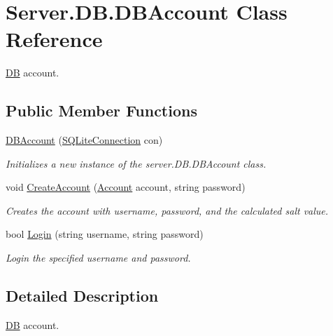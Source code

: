 \hypertarget{classServer_1_1DB_1_1DBAccount}{\section{Server.\-D\-B.\-D\-B\-Account Class Reference}
\label{classServer_1_1DB_1_1DBAccount}
}


\hyperlink{namespaceServer_1_1DB}{D\-B} account.  


\subsection*{Public Member Functions}
\begin{DoxyCompactItemize}
\item 
\hyperlink{classServer_1_1DB_1_1DBAccount_a09329b7a7cc362eca6d1d54571159395}{D\-B\-Account} (\hyperlink{classSQLite_1_1SQLiteConnection}{S\-Q\-Lite\-Connection} con)
\begin{DoxyCompactList}\small\item\em Initializes a new instance of the server.\-D\-B.\-D\-B\-Account class. \end{DoxyCompactList}\item 
void \hyperlink{classServer_1_1DB_1_1DBAccount_a3b7e2921efb6f6e7ceecba07d3068a1f}{Create\-Account} (\hyperlink{classCore_1_1Models_1_1Account}{Account} account, string password)
\begin{DoxyCompactList}\small\item\em Creates the account with username, password, and the calculated salt value. \end{DoxyCompactList}\item 
bool \hyperlink{classServer_1_1DB_1_1DBAccount_a53bbc0085fc15347e5d67ff1ee9ee925}{Login} (string username, string password)
\begin{DoxyCompactList}\small\item\em Login the specified username and password. \end{DoxyCompactList}\end{DoxyCompactItemize}


\subsection{Detailed Description}
\hyperlink{namespaceServer_1_1DB}{D\-B} account. 



